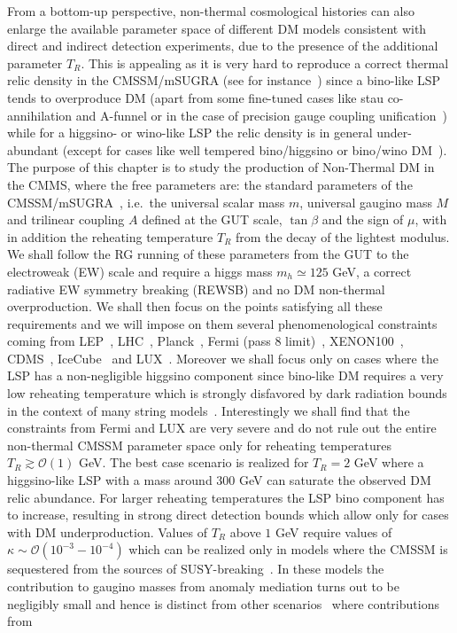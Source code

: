 \documentclass[12pt,a4paper]{book}
\newcommand{\mc}{\mathcal}
\begin{document}
From a bottom-up perspective, non-thermal cosmological histories can also enlarge the available parameter space of different DM models consistent with direct and indirect detection experiments, due to the presence of the additional parameter $T_R$. This is appealing as it is very hard to reproduce a correct thermal relic density in the CMSSM/mSUGRA (see for instance~\cite{Baer:2012uya}) since a bino-like LSP tends to overproduce DM
(apart from some fine-tuned cases like stau co-annihilation and A-funnel or in the case of precision gauge coupling unification~\cite{Krippendorf:2013dqa}) while for a higgsino- or wino-like LSP the relic density is in general under-abundant (except for cases like well tempered bino/higgsino or bino/wino DM~\cite{ArkaniHamed:2006mb}).\\

The purpose of this chapter is to study the production of Non-Thermal DM in the CMMS, where the free parameters are: the standard parameters of the CMSSM/mSUGRA~\cite{Arnowitt:1992aq, Barger:1993gh, Kane:1993td, Baer:1996kv}, i.e.~the universal scalar mass $m$, universal gaugino mass $M$ and trilinear coupling $A$ defined at the GUT scale, $\tan\beta$ and the sign of $\mu$, with in addition the reheating temperature $T_R$ from the decay of the lightest modulus. We shall follow the RG running of these parameters from the GUT to the electroweak (EW) scale and require a higgs mass $m_h \simeq 125$ GeV, a correct radiative EW symmetry breaking (REWSB) and no DM non-thermal overproduction. We shall then focus on the points satisfying all these requirements and we will impose on them several phenomenological constraints coming from LEP~\cite{LEP1, LEP2, LEP3, LEP4}, LHC~\cite{Aad:2014wea,Aad:2012hm, Chatrchyan:2012lia, Aad:2014vma, Khachatryan:2014qwa}, Planck~\cite{Ade:2015xua}, Fermi (pass 8 limit)~\cite{Ackermann:2015tah}, XENON100~\cite{Orrigo:2015cha}, CDMS~\cite{Agnese:2013rvf}, IceCube~\cite{Aartsen:2012kia} and LUX~\cite{Akerib:2013tjd}. Moreover we shall focus only on cases where the LSP has a non-negligible higgsino component since bino-like DM requires a very low reheating temperature which is strongly disfavored by dark radiation bounds in the context of many string models~\cite{Allahverdi:2014ppa}. Interestingly we shall find that the constraints from Fermi and LUX are very severe and do not rule out the entire non-thermal CMSSM parameter space only for reheating temperatures $T_R\gtrsim \mc{O}(1)$ GeV. The best case scenario is realized for $T_R = 2$ GeV where a higgsino-like LSP with a mass around $300$ GeV can saturate the observed DM relic abundance. For larger reheating temperatures the LSP bino component has to increase, resulting in strong direct detection bounds which allow only for cases with DM underproduction. Values of $T_R$ above $1$ GeV require values of $\kappa\sim\mc{O}(10^{-3}-10^{-4})$ which can be realized only in models where the CMSSM is sequestered from the sources of SUSY-breaking~\cite{Aparicio:2014wxa, Blumenhagen:2009gk}. In these models the contribution to gaugino masses from anomaly mediation turns out to be negligibly small and hence is distinct from other scenarios~\cite{Choi:2005ge, Lowen:2008fm, Acharya:2008zi, Dudas:2012wi} where contributions from 
\end{document}
